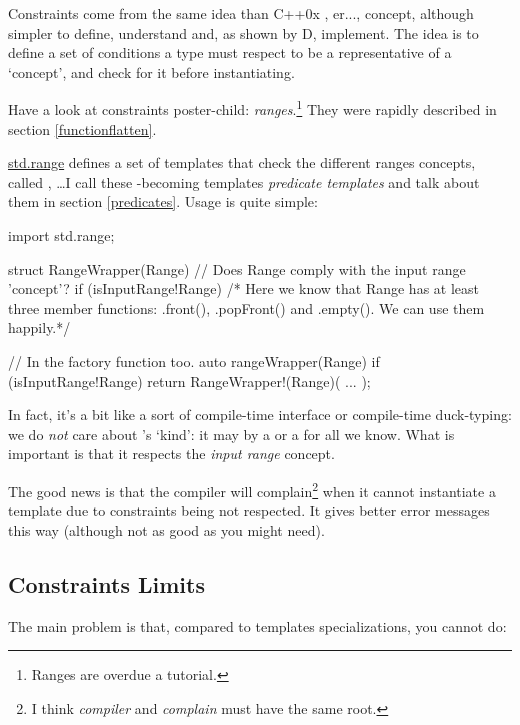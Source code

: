Constraints come from the same idea than C++0x , er..., concept, although simpler to define, understand and, as shown by D, implement. The idea is to define a set of conditions a type must respect to be a representative of a `concept', and check for it before instantiating.

Have a look at constraints poster-child: \emph{ranges}.\footnote{ Ranges are overdue a tutorial.} They were rapidly described in section \ref{functionflatten}.

\href{www.d-programming-org/phobos/std_range.html}{std.range} defines a set of templates that check the different ranges concepts, called , \ldots I call these -becoming templates \emph{predicate templates} and talk about them in section \ref{predicates}. Usage is quite simple:

\begin{dcode}
import std.range;

struct RangeWrapper(Range) 
    // Does Range comply with the input range 'concept'?
    if (isInputRange!Range) 
{ 
   /* Here we know that Range has at least three member functions:
      .front(), .popFront() and .empty(). We can use them happily.*/
}

// In the factory function too.
auto rangeWrapper(Range) if (isInputRange!Range) 
{
    return RangeWrapper!(Range)( ... );
}
\end{dcode}

In fact, it's a bit like a sort of compile-time interface or compile-time duck-typing: we do \emph{not} care about 's `kind': it may by a  or a  for all we know. What is important is that it respects the \emph{input range} concept.

The good news is that the compiler will complain\footnote{ I think \emph{compiler} and \emph{complain} must have the same root.} when it cannot instantiate a template due to constraints being not respected. It gives better error messages this way (although not as good as you might need).

\subsection{Constraints Limits}\label{constraintslimits}

The main problem is that, compared to templates specializations, you cannot do:

